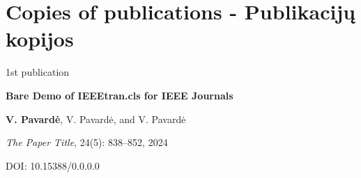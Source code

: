 
\chapter*{Copies of publications - Publikacijų kopijos}
\label{cha:publicationscopies} 



\vspace*{15mm}

\begin{center}

{\huge 1st publication}
\vspace{10mm}

{\Large \bf Bare Demo of IEEEtran.cls for IEEE Journals}

\vspace{5mm}
\textbf{V. Pavardė}, V. Pavardė, and V. Pavardė

\vspace{5mm}
\textit{The Paper Title}, 24(5): 838--852, 2024


\vspace{3mm}
DOI: 10.15388/0.0.0.0

\end{center}

\newpage
